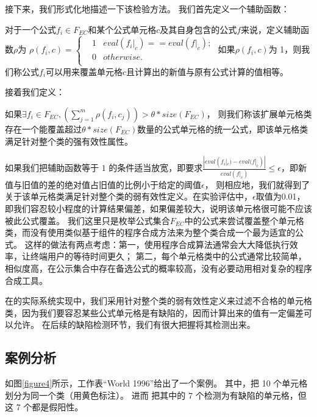 接下来，我们形式化地描述一下该检验方法。
我们首先定义一个辅助函数：
\begin{definition}
    对于一个公式$f_i \in F_{EC}$和某个公式单元格$c$及其自身包含的公式$f$来说，定义辅助函数$\rho$为
    $
    \rho(f_i, c) = 
    \left\{
        \begin{aligned}
        & 1     & eval(f_i|_c) == eval(f|_c); \\
        & 0     & otherwise. \\
        \end{aligned}
    \right.
    $
    如果$\rho(f_i,c)$为 1，则我们称公式$f_i$可以用来覆盖单元格$c$且计算出的新值与原有公式计算的值相等。
\end{definition}

接着我们定义：
\begin{definition}
    如果$\exists f_i \in F_{EC}, (\sum_{j = 1}^{m} \rho(f_i, c_j)) > \theta  * size(F_{EC})$，
    则我们称该扩展单元格类存在一个能覆盖超过$\theta  * size(F_{EC})$数量的公式单元格的统一公式，即该单元格类满足针对整个类的强有效性属性。
\end{definition}

如果我们把辅助函数等于 $1$ 的条件适当放宽，即要求$\frac{|eval(f_i|_c)-eval(f|_c)|}{eval(f|_c)} \leq \epsilon$，即新值与旧值的差的绝对值占旧值的比例小于给定的阈值$\epsilon$，
则相应地，我们就得到了关于该单元格类满足针对整个类的弱有效性定义。在实验评估中，$\epsilon$取值为0.01，即我们容忍较小程度的计算结果偏差，如果偏差较大，说明该单元格很可能不应该被此公式覆盖。
我们这里只是枚举公式集合$F_{EC}$中的公式来尝试覆盖整个单元格类，而没有使用类似基于组件的程序合成方法来为整个类合成一个最为适宜的公式。
这样的做法有两点考虑：第一，使用程序合成算法通常会大大降低执行效率，让终端用户的等待时间更久；
第二，每个单元格类中的公式通常比较简单，相似度高，在公示集合中存在备选公式的概率较高，没有必要动用相对复杂的程序合成工具。

在\wa 的实际系统实现中，我们采用针对整个类的弱有效性定义来过滤不合格的单元格类，因为我们要容忍某些公式单元格是有缺陷的，因而计算出来的值有一定偏差可以允许。
在后续的缺陷检测环节，我们有很大把握将其检测出来。

\subsection*{案例分析}

如图\ref{figure4}所示，工作表“World 1996”给出了一个案例。
其中，\cu 把 10 个单元格划分为同一个类（用黄色标注）。
进而 \cu 把其中的 7 个检测为有缺陷的单元格，但这 7 个都是假阳性。

